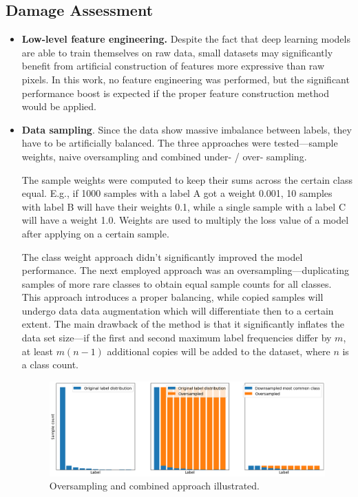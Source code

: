 \documentclass[thesis=B,english]{FITthesis}[2019/12/23]
\begin{document}
\subsection{Damage Assessment}

\begin{itemize}
	\item \textbf{Low-level feature engineering.} Despite the fact that deep learning models are able to train themselves on raw data, small datasets may significantly benefit from artificial construction of features more expressive than raw pixels. In this work, no feature engineering was performed, but the significant performance boost is expected if the proper feature construction method would be applied.
	
	\item \textbf{Data sampling}. Since the data show massive imbalance between labels, they have to be artificially balanced. The three approaches were tested---sample weights, naive oversampling and combined under- / over- sampling.
	
	The sample weights were computed to keep their sums across the certain class equal. E.g., if 1000 samples with a label A got a weight 0.001, 10 samples with label B will have their weights 0.1, while a single sample with a label C will have a weight 1.0. Weights are used to multiply the loss value of a model after applying on a certain sample.
	
	The class weight approach didn't significantly improved the model performance. The next employed approach was an oversampling---duplicating samples of more rare classes to obtain equal sample counts for all classes. This approach introduces a proper balancing, while copied samples will undergo data data augmentation which will differentiate then to a certain extent. The main drawback of the method is that it significantly inflates the data set size---if the first and second maximum label frequencies differ by $m$, at least $m(n-1)$ additional copies will be added to the dataset, where $n$ is a class count.
	
	\begin{figure}[h]
		\centering
		\includegraphics[width=\textwidth]{images/oversampling.png}
		\caption{Oversampling and combined approach illustrated.}
	\end{figure}
	

\end{itemize}
\end{document}

